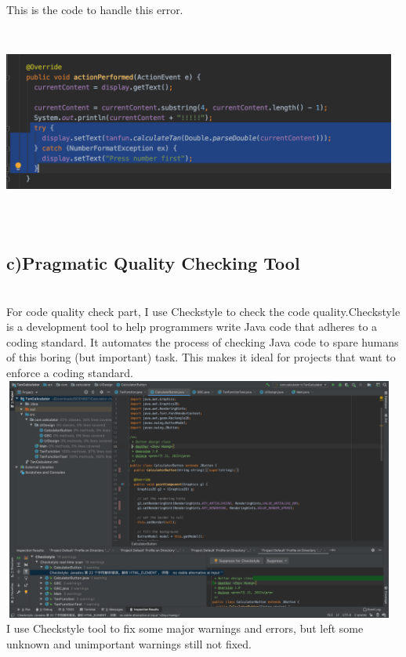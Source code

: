 \documentclass[letterpaper, 11pt]{report}
\begin{document}
\newline
This is the code to handle this error.\\
\newline
\includegraphics[width=13cm,height = 7cm]{err3}\\
\subsection*{c)Pragmatic Quality Checking Tool}\\
For code quality check part, I use Checkstyle to check the code quality.\cite{check}Checkstyle is a development tool to help programmers write Java code that adheres to a coding standard. It automates the process of checking Java code to spare humans of this boring (but important) task. This makes it ideal for projects that want to enforce a coding standard.\\
\newline
\includegraphics[width=13cm,height = 8cm]{check}\\
\newline
I use Checkstyle tool to fix some major warnings and errors, but left some unknown and unimportant warnings still not fixed.
\pagebreak
\newpage
\end{document}
